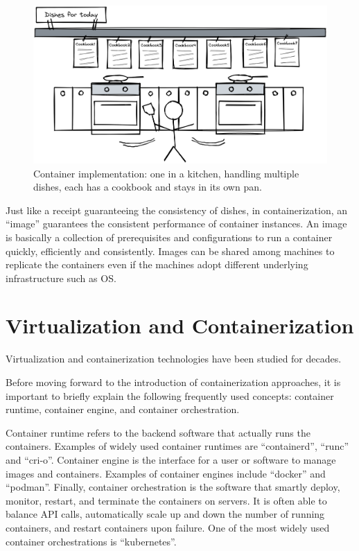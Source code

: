 \begin{figure}
	\centering
	\includegraphics[width=350pt]{chapters/ch-virtualization-and-containerization/figures/multitaskcook.png}
	\caption{Container implementation: one in a kitchen, handling multiple dishes, each has a cookbook and stays in its own pan.} \label{ch:vac:fig:multitaskcook}
\end{figure}

Just like a receipt guaranteeing the consistency of dishes, in containerization, an ``image'' guarantees the consistent performance of container instances. An image is basically a collection of prerequisites and configurations to run a container quickly, efficiently and consistently. Images can be shared among machines to replicate the containers even if the machines adopt different underlying infrastructure such as OS.

\section{Virtualization and Containerization}

Virtualization and containerization technologies have been studied for decades.

Before moving forward to the introduction of containerization approaches, it is important to briefly explain the following frequently used concepts: container runtime, container engine, and container orchestration.

Container runtime refers to the backend software that actually runs the containers. Examples of widely used container runtimes are ``containerd'', ``runc'' and ``cri-o''. Container engine is the interface for a user or software to manage images and containers. Examples of container engines include ``docker'' and ``podman''. Finally, container orchestration is the software that smartly deploy, monitor, restart, and terminate the containers on servers. It is often able to balance API calls, automatically scale up and down the number of running containers, and restart containers upon failure. One of the most widely used container orchestrations is ``kubernetes''.

